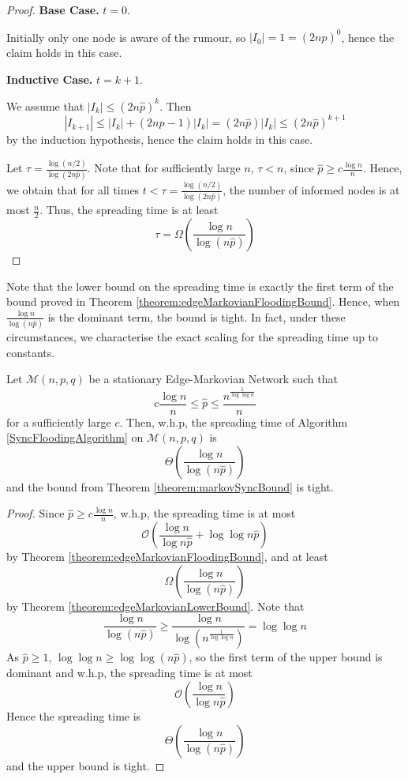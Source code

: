 \begin{proof}
	\textbf{Base Case.} $t=0$.

	Initially only one node is aware of the rumour, so $|I_0| = 1 = (2n\hat{p})^0$, hence the claim holds in this case.

	\textbf{Inductive Case.} $t=k+1$.

	We assume that $|I_k| \leq (2n\hat{p})^k$. Then 
	$$
		|I_{k+1}| \leq |I_k| + (2n\hat{p} - 1)|I_k| = (2n\hat{p})|I_k| \leq (2n\hat{p})^{k+1}
	$$
	by the induction hypothesis, hence the claim holds in this case.

	Let $\tau = \frac{\log (n/2)}{\log(2n\hat{p})}$. Note that for sufficiently large $n$, $\tau < n$, since $\hat{p} \geq c \frac{\log n}{n}$.  %
	Hence, we obtain that for all times $t < \tau = \frac{\log (n/2)}{\log(2n\hat{p})}$, the number of informed nodes is at most $\frac{n}{2}$. Thus, the spreading time is at least 
	$$
		\tau = \Omega\left(\frac{\log n}{\log(n \hat{p})}\right)
	$$
\end{proof}

Note that the lower bound on the spreading time is exactly the first term of the bound proved in Theorem \ref{theorem:edgeMarkovianFloodingBound}. Hence, when $\frac{\log n}{\log (n\hat{p})}$ is the dominant term, the bound is tight. In fact, under these circumstances, we characterise the exact scaling for the spreading time up to constants.

\begin{corollary}\label{corollary:edgeMarkovianThetaBound}
	Let $\mathcal{M}(n, p, q)$ be a stationary Edge-Markovian Network such that 
	$$
		c \frac{\log n}{n} \leq \hat{p} \leq  \frac{n^\frac{1}{\log \log n}}{n}
	$$
	for a sufficiently large $c$. Then, w.h.p, the spreading time of Algorithm \ref{SyncFloodingAlgorithm} on $\mathcal{M}(n, p , q)$ is 
	$$
		\Theta\left(\frac{\log n}{\log(n\hat{p})}\right)
	$$
	and the bound from Theorem \ref{theorem:markovSyncBound} is tight.
\end{corollary}

\begin{proof}
	Since $\hat{p} \geq c \frac{\log n}{n}$, w.h.p, the spreading time is at most 
	$$
		\mathcal{O}\left(\frac{\log n}{\log n\hat{p}} + \log \log n\hat{p} \right)
	$$ by Theorem \ref{theorem:edgeMarkovianFloodingBound}, and at least 
	$$
		\Omega\left(\frac{\log n}{\log(n \hat{p})}\right)
	$$
	by Theorem \ref{theorem:edgeMarkovianLowerBound}.
	Note that 
	$$
		\frac{\log n}{\log(n\hat{p})} \geq \frac{\log n}{\log(n^\frac{1}{\log \log n})} = \log \log n
	$$
	As $\hat{p} \geq 1$, $\log \log n \geq \log \log (n\hat{p})$, so the first term of the upper bound is dominant and w.h.p, the spreading time is at most 
	$$
		\mathcal{O}\left(\frac{\log n}{\log n\hat{p}}\right)
	$$
	Hence the spreading time is
	$$
		\Theta\left(\frac{\log n}{\log(n\hat{p})}\right)
	$$
	and the upper bound is tight.
\end{proof}

